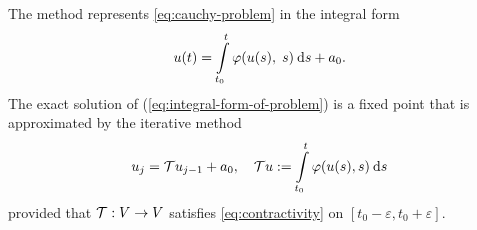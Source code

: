 The \PL method represents \eqref{eq:cauchy-problem} in the 
integral form
%
\begin{equation}
    u(t) = \Int_{t_0}^{t}\varphi(u(s),\;s) \ds + a_0.
    \label{eq:integral-form-of-problem}
\end{equation}
%
The exact solution of (\ref{eq:integral-form-of-problem}) is a fixed point
that is approximated by the iterative method
%
\begin{equation}
	u_j = \Tau u_{j - 1} + a_0, 
	\quad \Tau u := \Int_{t_0}^{t}\varphi(u(s), s) \ds
  \label{eq:iterative-form-of-problem}
\end{equation}
%
provided that $\mathcal{T}: V \rightarrow V$ satisfies \eqref{eq:contractivity} on 
$[t_0 - \varepsilon, t_0 + \varepsilon]$.

